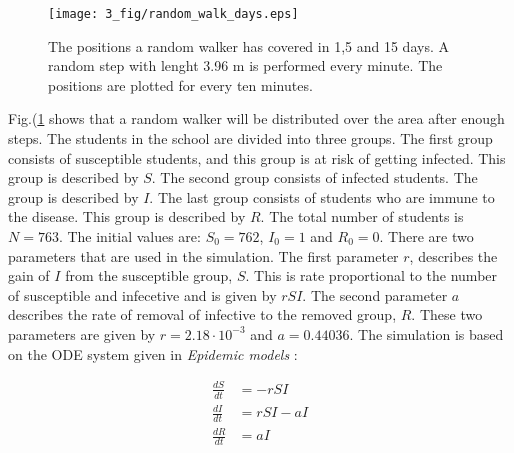 \documentclass[%
twoside,                 %
final,                   %
chapterprefix=true,      %
open=right               %
10pt]{book}
\begin{document}
\begin{figure}[ht]
  \centerline{\texttt{[image: 3\_fig/random\_walk\_days.eps]}}
  \caption{
  \label{fig:random_walker_days} The positions a random walker has covered in 1,5 and 15 days. A random step with lenght 3.96 m is performed every minute. The positions are plotted for every ten minutes.
  }
\end{figure}


Fig.(\ref{fig:random_walker_days} shows that a random walker will be distributed over the area after enough steps. The students in the school are divided into three groups. The first group consists of susceptible students, and this group is at risk of getting infected. This group is described by $S$. The second group consists of infected students. The group is described by $I$. The last group consists of students who are immune to the disease. This group is described by $R$. The total number of students is $N=763$. The initial values are: $S_0=762$, $I_0=1$ and $R_0=0$. There are two parameters that are used in the simulation. The first parameter $r$, describes the gain of $I$ from the susceptible group, $S$. This is rate proportional to the number of susceptible and infecetive and is given by $rSI$. The second parameter $a$ describes the rate of removal of infective to the removed group, $R$. These two parameters are given by $r=2.18\cdot 10^{-3}$ and $a=0.44036$. The simulation is based on the ODE system given in \emph{Epidemic models} :

\begin{equation} \label{eq:SIR_model_random}
	\begin{aligned} 
	\frac{dS}{dt} &= -rSI \\ 
	\frac{dI}{dt} &= rSI-aI \\ 
	\frac{dR}{dt} &= aI 
	\end{aligned}
\end{equation}
\end{document}
